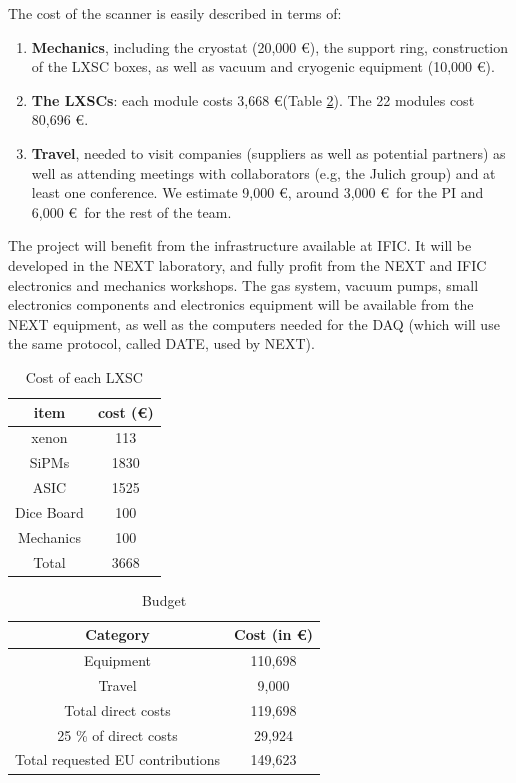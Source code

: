 \documentclass[11pt,a4paper]{article}
\begin{document}
The cost of the scanner is easily described in terms of:
\begin{enumerate}
\item {\bf Mechanics}, including the cryostat (20,000 \euro), the support ring, construction of the LXSC boxes, as well as vacuum and cryogenic equipment (10,000 \euro).
\item {\bf The LXSCs}: each module costs 3,668 \euro (Table \ref{tab.box}). The 22 modules cost 80,696 \euro. 
\item {\bf Travel}, needed to visit companies (suppliers as well as potential partners) as well as attending meetings with collaborators (e.g, the Julich group) and at least one conference. We estimate 9,000 \euro, around 3,000 \euro\ for the PI and 6,000 \euro\ for the rest of the team. 
\end{enumerate}

The project will benefit from the infrastructure available at IFIC. It will be developed in the NEXT laboratory, and fully profit from the NEXT and IFIC electronics and mechanics workshops. The gas system, vacuum pumps, small electronics components and electronics equipment will be available from the NEXT equipment, as well as the computers needed for the DAQ (which will use the same protocol, called DATE, used by NEXT).  

\begin{table}[htdp!]
\caption{Cost of each LXSC}
\begin{center}
\begin{tabular}{|c|c|}
\hline
item & cost (\euro) \\
\hline
xenon &	113 \\
SiPMs &	1830 \\
ASIC	 & 1525 \\
Dice Board & 100 \\
Mechanics &100 \\
\hline
Total	 & 3668 \\
\hline\hline
\end{tabular}
\end{center}
\label{tab.box}
\end{table}%

\begin{table}[htdp!]
\caption{Budget}
\begin{center}
\begin{tabular}{|c|c|}
\hline
Category & Cost (in \euro) \\
\hline
Equipment & 110,698 \\
Travel & 9,000 \\
Total direct costs & 119,698 \\
25 \% of direct costs & 29,924 \\
Total requested EU contributions & 149,623 \\
\hline\hline
\end{tabular}
\end{center}
\label{tab.box}
\end{table}%
 
\end{document}
